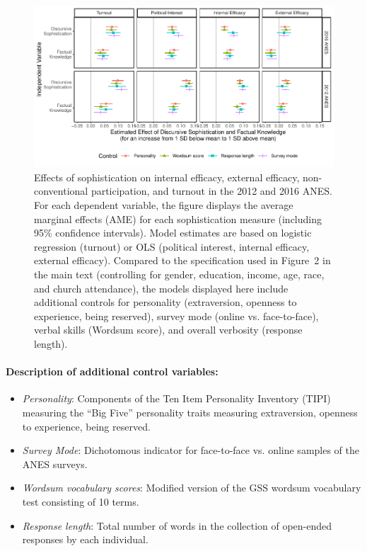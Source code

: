 \documentclass[12pt]{article}
\begin{document}
\begin{figure}[h]\centering
	\includegraphics{../out/appC3-knoweff_robust.pdf}
	\caption{Effects of sophistication on internal efficacy, external efficacy, non-conventional participation, and turnout in the 2012 and 2016 ANES. For each dependent variable, the figure displays the average marginal effects (AME) for each sophistication measure (including 95\% confidence intervals). Model estimates are based on logistic regression (turnout) or OLS (political interest, internal efficacy, external efficacy). Compared to the specification used in Figure~2 in the main text (controlling for gender, education, income, age, race, and church attendance), the models displayed here include additional controls for personality (extraversion, openness to experience, being reserved), survey mode (online vs. face-to-face), verbal skills (Wordsum score), and overall verbosity (response length).}\label{fig:knoweff_robust}
\end{figure}

\paragraph{Description of additional control variables:}

\begin{itemize}
	\item \textit{Personality}: Components of the Ten Item Personality Inventory (TIPI) measuring the ``Big Five'' personality traits measuring extraversion, openness to experience, being reserved.
	\item \textit{Survey Mode}: Dichotomous indicator for face-to-face vs. online samples of the ANES surveys.
	\item \textit{Wordsum vocabulary scores}: Modified version of the GSS wordsum vocabulary test consisting of 10 terms.
	\item \textit{Response length}: Total number of words in the collection of open-ended responses by each individual.
\end{itemize}
\end{document}
